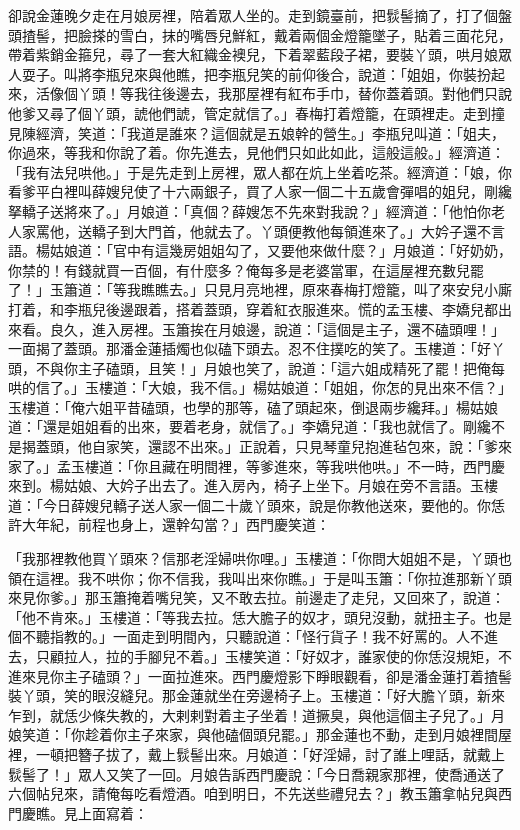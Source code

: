 \begin{showcontents}{}
卻說金蓮晚夕走在月娘房裡，陪着眾人坐的。走到鏡臺前，把䯼髻摘了，打了個盤頭揸髻，把臉搽的雪白，抹的嘴唇兒鮮紅，戴着兩個金燈籠墜子，貼着三面花兒，帶着紫銷金箍兒，尋了一套大紅織金襖兒，下着翠藍段子裙，要裝丫頭，哄月娘眾人耍子。叫將李瓶兒來與他瞧，把李瓶兒笑的前仰後合，說道：「姐姐，你裝扮起來，活像個丫頭！等我往後邊去，我那屋裡有紅布手巾，替你蓋着頭。對他們只說他爹又尋了個丫頭，諕他們諕，管定就信了。」春梅打着燈籠，在頭裡走。走到撞見陳經濟，笑道：「我道是誰來？這個就是五娘幹的營生。」李瓶兒叫道：「姐夫，你過來，等我和你說了着。你先進去，見他們只如此如此，這般這般。」經濟道：「我有法兒哄他。」于是先走到上房裡，眾人都在炕上坐着吃茶。經濟道：「娘，你看爹平白裡叫薛嫂兒使了十六兩銀子，買了人家一個二十五歲會彈唱的姐兒，剛纔拏轎子送將來了。」月娘道：「真個？薛嫂怎不先來對我說？」經濟道：「他怕你老人家罵他，送轎子到大門首，他就去了。丫頭便教他每領進來了。」大妗子還不言語。楊姑娘道：「官中有這幾房姐姐勾了，又要他來做什麼？」月娘道：「好奶奶，你禁的！有錢就買一百個，有什麼多？俺每多是老婆當軍，在這屋裡充數兒罷了！」玉簫道：「等我瞧瞧去。」只見月亮地裡，原來春梅打燈籠，叫了來安兒小廝打着，和李瓶兒後邊跟着，搭着蓋頭，穿着紅衣服進來。慌的孟玉樓、李嬌兒都出來看。良久，進入房裡。玉簫挨在月娘邊，說道：「這個是主子，還不磕頭哩！」一面揭了蓋頭。那潘金蓮插燭也似磕下頭去。忍不住撲吃的笑了。玉樓道：「好丫頭，不與你主子磕頭，且笑！」月娘也笑了，說道：「這六姐成精死了罷！把俺每哄的信了。」玉樓道：「大娘，我不信。」楊姑娘道：「姐姐，你怎的見出來不信？」玉樓道：「俺六姐平昔磕頭，也學的那等，磕了頭起來，倒退兩步纔拜。」楊姑娘道：「還是姐姐看的出來，要着老身，就信了。」李嬌兒道：「我也就信了。剛纔不是揭蓋頭，他自家笑，還認不出來。」正說着，只見琴童兒抱進毡包來，說：「爹來家了。」孟玉樓道：「你且藏在明間裡，等爹進來，等我哄他哄。」不一時，西門慶來到。楊姑娘、大妗子出去了。進入房內，椅子上坐下。月娘在旁不言語。玉樓道：「今日薛嫂兒轎子送人家一個二十歲丫頭來，說是你教他送來，要他的。你恁許大年紀，前程也身上，還幹勾當？」西門慶笑道：

「我那裡教他買丫頭來？信那老淫婦哄你哩。」玉樓道：「你問大姐姐不是，丫頭也領在這裡。我不哄你；你不信我，我叫出來你瞧。」于是叫玉簫：「你拉進那新丫頭來見你爹。」那玉簫掩着嘴兒笑，又不敢去拉。前邊走了走兒，又回來了，說道：「他不肯來。」玉樓道：「等我去拉。恁大膽子的奴才，頭兒沒動，就扭主子。也是個不聽指教的。」一面走到明間內，只聽說道：「怪行貨子！我不好罵的。人不進去，只顧拉人，拉的手腳兒不着。」玉樓笑道：「好奴才，誰家使的你恁沒規矩，不進來見你主子磕頭？」一面拉進來。西門慶燈影下睜眼觀看，卻是潘金蓮打着揸髻裝丫頭，笑的眼沒縫兒。那金蓮就坐在旁邊椅子上。玉樓道：「好大膽丫頭，新來乍到，就恁少條失教的，大剌剌對着主子坐着！道撅臭，與他這個主子兒了。」月娘笑道：「你趁着你主子來家，與他磕個頭兒罷。」那金蓮也不動，走到月娘裡間屋裡，一頓把簪子拔了，戴上䯼髻出來。月娘道：「好淫婦，討了誰上哩話，就戴上䯼髻了！」眾人又笑了一回。月娘告訴西門慶說：「今日喬親家那裡，使喬通送了六個帖兒來，請俺每吃看燈酒。咱到明日，不先送些禮兒去？」教玉簫拿帖兒與西門慶瞧。見上面寫着：


\end{showcontents}

